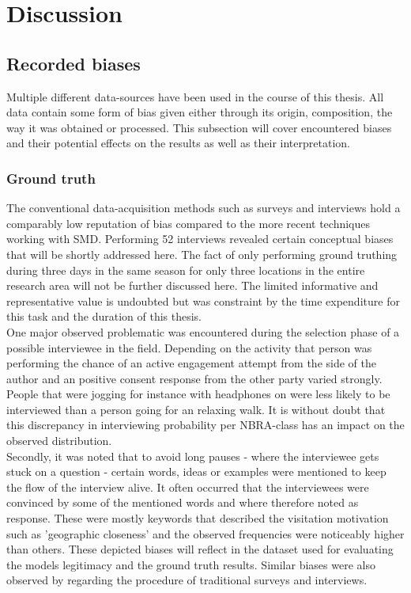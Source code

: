 \chapter{Discussion} \label{discussion}

\section{Recorded biases} \label{discussion_rec_bias}
Multiple different data-sources have been used in the course of this thesis. All data contain some form of bias given either through its origin, composition, the way it was obtained or processed. 
This subsection will cover encountered biases and their potential effects on the results as well as their interpretation.

\subsection*{Ground truth}
The conventional data-acquisition methods such as surveys and interviews hold a comparably low reputation of bias compared to the more recent techniques working with SMD. Performing 52 interviews revealed certain conceptual biases that will be shortly addressed here. The fact of only performing ground truthing during three days in the same season for only three locations in the entire research area will not be further discussed here. The limited informative and representative value is undoubted but was constraint by the time expenditure for this task and the duration of this thesis. \\
\newline
One major observed problematic was encountered during the selection phase of a possible interviewee in the field. Depending on the activity that person was performing the chance of an active engagement attempt from the side of the author and an positive consent response from the other party varied strongly. People that were jogging for instance with headphones on were less likely to be interviewed than a person going for an relaxing walk. It is without doubt that this discrepancy in interviewing probability per NBRA-class has an impact on the observed distribution.\\
Secondly, it was noted that to avoid long pauses - where the interviewee gets stuck on a question - certain words, ideas or examples were mentioned to keep the flow of the interview alive. It often occurred that the interviewees were convinced by some of the mentioned words and where therefore noted as response. These were mostly keywords that described the visitation motivation such as 'geographic closeness' and the observed frequencies were noticeably higher than others. These depicted biases will reflect in the dataset used for evaluating the models legitimacy and the ground truth results. Similar biases were also observed by \parencite{Hanemann2011, Kling2012, Tenerelli2016} regarding the procedure of traditional surveys and interviews.

